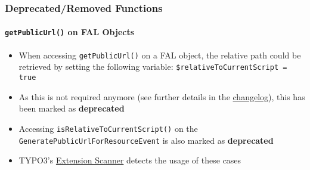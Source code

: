 %

\begin{frame}[fragile]
	\frametitle{Deprecated/Removed Functions}
	\framesubtitle{\texttt{getPublicUrl()} on FAL Objects}

	\begin{itemize}
		\item When accessing \texttt{getPublicUrl()} on a FAL object, the relative
			path could be retrieved by setting the following variable:\newline
			\small\texttt{\$relativeToCurrentScript = true}\normalsize
		\item As this is not required anymore (see further details in the
			\href{https://docs.typo3.org/c/typo3/cms-core/master/en-us/Changelog/11.3/Deprecation-94193-PublicUrlWithRelativePathsInFALAPI.html}{changelog}),
			this has been marked as \textbf{deprecated}
		\item Accessing \texttt{isRelativeToCurrentScript()} on the
			\texttt{GeneratePublicUrlForResourceEvent} is also marked as
			\textbf{deprecated}
		\item TYPO3's
			\href{https://docs.typo3.org/m/typo3/reference-coreapi/master/en-us/ApiOverview/ExtensionScanner/Index.html}{Extension Scanner}
			detects the usage of these cases

	\end{itemize}

\end{frame}

